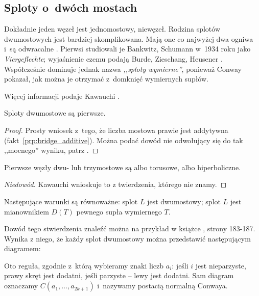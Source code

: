 
\subsection{Sploty o~dwóch mostach}
\label{sub:twobridge}%
%
%
Dokładnie jeden węzeł jest jednomostowy, niewęzeł.
Rodzina splotów dwumostowych jest bardziej skomplikowana.
Mają one co najwyżej dwa ogniwa i~są odwracalne \cite[s. 211]{burde2014}.
Pierwsi studiowali je Bankwitz, Schumann \cite{bankwitz1934} w~1934 roku jako \emph{Viergeflechte}; wyjaśnienie czemu podają Burde, Zieschang, Heusener \cite[s. 25, 213]{burde2014}.
Współcześnie dominuje jednak nazwa \emph{,,sploty wymierne''}, ponieważ Conway pokazał, jak można je otrzymać z~domknięć wymiernych supłów.

Więcej informacji podaje Kawauchi \cite[s. 21-26]{kawauchi1996}.

\begin{proposition}
    Sploty dwumostowe są pierwsze.
\end{proposition}

\begin{proof}
    Prosty wniosek z~tego, że liczba mostowa prawie jest addytywna (fakt~\ref{prp:bridge_additive}).
    Można podać dowód nie odwołujący się do tak ,,mocnego'' wyniku, patrz \cite[s. 100]{burde2014}.
\end{proof}

\begin{corollary}
    Pierwsze węzły dwu- lub trzymostowe są albo torusowe, albo hiperboliczne.
\end{corollary}

\begin{proof}[Niedowód]
    Kawauchi \cite[s. 130]{kawauchi1996} wnioskuje to z twierdzenia, którego nie znamy.
\end{proof}

\begin{proposition}
    Następujące warunki są równoważne: splot $L$ jest dwumostowy; splot $L$ jest mianownikiem $D(T)$ pewnego supła wymiernego $T$.
\end{proposition}

Dowód tego stwierdzenia znaleźć można na przykład w książce \cite{murasugi1996}, strony 183-187.
Wynika z niego, że każdy splot dwumostowy można przedstawić następującym diagramem:


Oto reguła, zgodnie z~którą wybieramy znaki liczb $a_i$:
jeśli $i$ jest nieparzyste, prawy skręt jest dodatni, jeśli parzyste -- lewy jest dodatni.
Sam diagram oznaczamy $C(a_1, \ldots, a_{2k+1})$ i~nazywamy postacią normalną Conwaya.
\label{conway_notation}%

